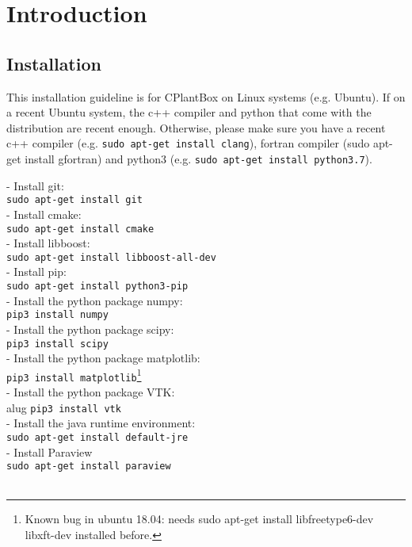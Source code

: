 \newpage
\section{Introduction}
\subsection{Installation}

This installation guideline is for CPlantBox on Linux systems (e.g. Ubuntu). 
If on a recent Ubuntu system, the c++ compiler and python that come with the distribution are recent enough. Otherwise, please make sure you have a recent c++ compiler (e.g. \lstinline{sudo apt-get install clang}), fortran compiler (sudo apt-get install gfortran) and python3 (e.g. \lstinline{sudo apt-get install python3.7}). 

- Install git: \\
\lstinline{sudo apt-get install git}\\
- Install cmake:\\
\lstinline{sudo apt-get install cmake}\\
- Install libboost:\\
\lstinline{sudo apt-get install libboost-all-dev}\\
- Install pip:\\
\lstinline{sudo apt-get install python3-pip}\\
- Install the python package numpy:\\
\lstinline{pip3 install numpy}\\
- Install the python package scipy:\\
\lstinline{pip3 install scipy}\\
- Install the python package matplotlib:\\
\lstinline{pip3 install matplotlib}\footnote{Known bug in ubuntu 18.04: needs sudo apt-get install libfreetype6-dev libxft-dev installed before.}\\
- Install the python package VTK:\\alug
\lstinline {pip3 install vtk}\\
- Install the java runtime environment:\\
\lstinline{sudo apt-get install default-jre}\\
- Install Paraview\\
\lstinline{sudo apt-get install paraview}\\

\lstinline{}\\

